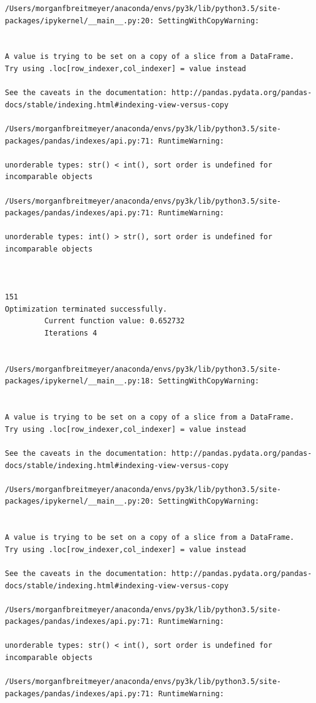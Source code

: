 \begin{lstlisting}
/Users/morganfbreitmeyer/anaconda/envs/py3k/lib/python3.5/site-packages/ipykernel/__main__.py:20: SettingWithCopyWarning:


A value is trying to be set on a copy of a slice from a DataFrame.
Try using .loc[row_indexer,col_indexer] = value instead

See the caveats in the documentation: http://pandas.pydata.org/pandas-docs/stable/indexing.html#indexing-view-versus-copy

/Users/morganfbreitmeyer/anaconda/envs/py3k/lib/python3.5/site-packages/pandas/indexes/api.py:71: RuntimeWarning:

unorderable types: str() < int(), sort order is undefined for incomparable objects

/Users/morganfbreitmeyer/anaconda/envs/py3k/lib/python3.5/site-packages/pandas/indexes/api.py:71: RuntimeWarning:

unorderable types: int() > str(), sort order is undefined for incomparable objects



151
Optimization terminated successfully.
         Current function value: 0.652732
         Iterations 4


/Users/morganfbreitmeyer/anaconda/envs/py3k/lib/python3.5/site-packages/ipykernel/__main__.py:18: SettingWithCopyWarning:


A value is trying to be set on a copy of a slice from a DataFrame.
Try using .loc[row_indexer,col_indexer] = value instead

See the caveats in the documentation: http://pandas.pydata.org/pandas-docs/stable/indexing.html#indexing-view-versus-copy

/Users/morganfbreitmeyer/anaconda/envs/py3k/lib/python3.5/site-packages/ipykernel/__main__.py:20: SettingWithCopyWarning:


A value is trying to be set on a copy of a slice from a DataFrame.
Try using .loc[row_indexer,col_indexer] = value instead

See the caveats in the documentation: http://pandas.pydata.org/pandas-docs/stable/indexing.html#indexing-view-versus-copy

/Users/morganfbreitmeyer/anaconda/envs/py3k/lib/python3.5/site-packages/pandas/indexes/api.py:71: RuntimeWarning:

unorderable types: str() < int(), sort order is undefined for incomparable objects

/Users/morganfbreitmeyer/anaconda/envs/py3k/lib/python3.5/site-packages/pandas/indexes/api.py:71: RuntimeWarning:


\end{lstlisting}
